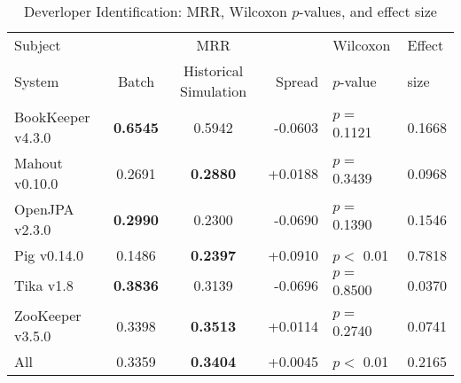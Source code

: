 \begin{table}[t]
\centering
\caption{Deverloper Identification: MRR, Wilcoxon $p$-values, and effect size}
\begin{tabular}{l|ccr|ll}
\toprule
Subject & & MRR & & Wilcoxon & Effect \\
System  &  Batch & Historical Simulation & Spread & $p$-value & size \\
\midrule
BookKeeper v4.3.0 & {\bf 0.6545 } & 0.5942 & -0.0603 & $p = $ 0.1121 & 0.1668 \\
Mahout v0.10.0 & 0.2691 & {\bf 0.2880 } & +0.0188 & $p = $ 0.3439 & 0.0968 \\
OpenJPA v2.3.0 & {\bf 0.2990 } & 0.2300 & -0.0690 & $p = $ 0.1390 & 0.1546 \\
Pig v0.14.0 & 0.1486 & {\bf 0.2397 } & +0.0910 & $p < $ 0.01 & 0.7818 \\
Tika v1.8 & {\bf 0.3836 } & 0.3139 & -0.0696 & $p = $ 0.8500 & 0.0370 \\
ZooKeeper v3.5.0 & 0.3398 & {\bf 0.3513 } & +0.0114 & $p = $ 0.2740 & 0.0741 \\
\midrule
All & 0.3359 & {\bf 0.3404 } & +0.0045 & $p < $ 0.01 & 0.2165 \\
\bottomrule
\end{tabular}
\label{table:triage_rq2}
\end{table}
